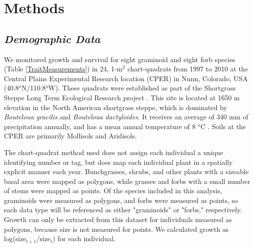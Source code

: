 \documentclass[12pt, letterpaper]{article}
\begin{document}
\section{Methods}
\subsection{\textit{Demographic Data}} We monitored growth and survival for eight graminoid and eight forb species (Table \ref{TraitMeasurements}) in 24, 1-m$^2$ chart-quadrats from 1997 to 2010 at the Central Plains Experimental Research location (CPER) in Nunn, Colorado, USA (40.8$^o$N/110.8$^o$W). These quadrats were established as part of the Shortgrass Steppe Long Term Ecological Research project \cite{Chu2013}. This site is located at 1650 m elevation in the North American shortgrass steppe, which is dominated by \textit{Bouteloua gracilis} and \textit{Bouteloua dactyloides}. It receives an average of 340 mm of precipitation annually, and has a mean annual temperature of 8 $^o$C \cite{Chu2014}. Soils at the CPER are primarily Mollisols and Aridisols.

The chart-quadrat method used does not assign each individual a unique identifying number or tag, but does map each individual plant in a spatially explicit manner each year. Bunchgrasses, shrubs, and other plants with a sizeable basal area were mapped as polygons, while grasses and forbs with a small number of stems were mapped as points. Of the species included in this analysis, graminoids were measured as polygons, and forbs were measured as points, so each data type will be referenced as either "graminoids" or "forbs," respectively. Growth can only be extracted from this dataset for individuals measured as polygons, because size is not measured for points. We calculated growth as log(size$_{t+1}$/size$_t$) for each individual. 
\end{document}
